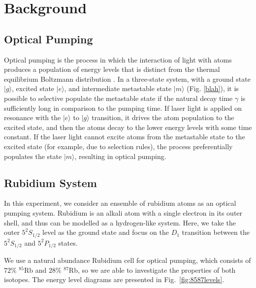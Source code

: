 
\section{Background}\label{background}

\subsection{Optical Pumping}

Optical pumping is the process in which the interaction of light with
atoms produces a population of energy levels that is distinct from the
thermal equilibrium Boltzmann distribution \cite{bernheim}. In a
three-state system, with a ground state $|g\rangle$, excited state
$|e\rangle$, and intermediate metastable state $|m\rangle$
(Fig. \ref{blah}), it is possible to selective populate the metastable
state if the natural decay time $\gamma$ is sufficiently long in
comparison to the pumping time. If laser light is applied on resonance
with the $|e\rangle$ to $|g\rangle$ transition, it drives the atom
population to the excited state, and then the atoms decay to the lower
energy levels with some time constant. If the laser light cannot
excite atoms from the metastable state to the excited state (for
example, due to selection rules), the process preferentially populates
the state $|m\rangle$, resulting in optical pumping.


\subsection{Rubidium System}

In this experiment, we consider an ensemble of rubidium atoms as an
optical pumping system. Rubidium is an alkali atom with a single
electron in its outer shell, and thus can be modelled as a
hydrogen-like system. Here, we take the outer $5^2S_{1/2}$ level as
the ground state and focus on the $D_1$ transition between the
$5^2S_{1/2}$ and $5^2P_{1/2}$ states. 

We use a natural abundance Rubidium cell for optical pumping, which
consists of $72\%$ $^{85}$Rb and $28\%$ $^{87}$Rb, so we are able to
investigate the properties of both isotopes. The energy level diagrams
are presented in Fig.~\ref{fig:8587levels}.


